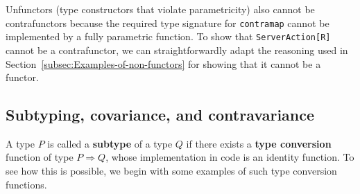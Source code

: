 Unfunctors (type constructors that violate parametricity)
also cannot be contrafunctors because the required type signature
for \lstinline!contramap! cannot be implemented by a fully parametric
function. To show that \lstinline!ServerAction[R]! cannot be a contrafunctor,
we can straightforwardly adapt the reasoning used in Section~\ref{subsec:Examples-of-non-functors}
for showing that it cannot be a functor.

\subsection{Subtyping, covariance, and contravariance}

A type $P$ is called a \textbf{subtype} of
a type $Q$ if there exists a \textbf{type
conversion} function of type $P\Rightarrow Q$, whose implementation
in code is an identity function. To see how this is possible, we begin
with some examples of such type conversion functions. 

